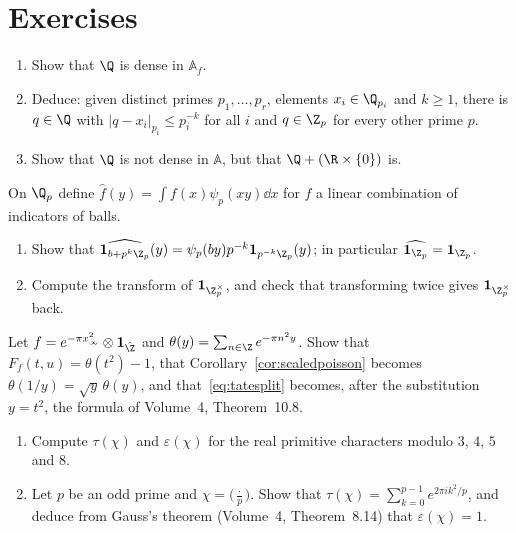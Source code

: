 \section{Exercises}

\begin{exercise}[$\star$]\label{ex:strongapprox}
\begin{enumerate}[label=(\alph*)]
\item Show that $\Q$ is dense in $\mathbb{A}_f$.
\item Deduce: given distinct primes $p_1,\dots,p_r$, elements $x_i\in\Q_{p_i}$ and $k\ge1$, there is $q\in\Q$ with $|q-x_i|_{p_i}\le p_i^{-k}$ for all $i$ and
$q\in\Z_p$ for every other prime $p$.
\item Show that $\Q$ is not dense in $\mathbb{A}$, but that $\Q+(\R\times\{0\})$ is.
\end{enumerate}
\end{exercise}

\begin{exercise}[$\star$]\label{ex:ftzp}
On $\Q_p$ define $\hat f(y)=\int f(x)\psi_p(xy)\dd x$ for $f$ a linear combination of indicators of balls.
\begin{enumerate}[label=(\alph*)]
\item Show that $\widehat{\mathbf 1_{b+p^k\Z_p}}(y)=\psi_p(by)p^{-k}\mathbf 1_{p^{-k}\Z_p}(y)$; in particular $\widehat{\mathbf 1_{\Z_p}}=\mathbf 1_{\Z_p}$.
\item Compute the transform of $\mathbf 1_{\Z_p^\times}$, and check that transforming twice gives $\mathbf 1_{\Z_p^\times}$ back.
\end{enumerate}
\end{exercise}

\begin{exercise}[$\star$]\label{ex:theta}
Let $f=e^{-\pi x_\infty^2}\otimes\mathbf 1_{\hat{\Z}}$ and $\theta(y)=\sum_{n\in\Z}e^{-\pi n^2y}$. Show that $F_f(t,u)=\theta(t^2)-1$, that
Corollary~\ref{cor:scaledpoisson} becomes $\theta(1/y)=\sqrt y\,\theta(y)$, and that~\eqref{eq:tatesplit} becomes, after the substitution $y=t^2$, the
formula of Volume~4, Theorem~10.8.
\end{exercise}

\begin{exercise}[$\star$]\label{ex:rootnumber}
\begin{enumerate}[label=(\alph*)]
\item Compute $\tau(\chi)$ and $\varepsilon(\chi)$ for the real primitive characters modulo $3$, $4$, $5$ and $8$.
\item Let $p$ be an odd prime and $\chi=\bigl(\frac\cdot p\bigr)$. Show that $\tau(\chi)=\sum_{k=0}^{p-1}e^{2\pi ik^2/p}$, and deduce from Gauss's theorem
(Volume~4, Theorem~8.14) that $\varepsilon(\chi)=1$.
\end{enumerate}
\end{exercise}

